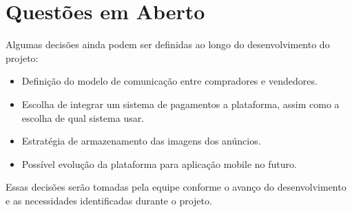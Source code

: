 \documentclass[a4paper,12pt]{article}
\begin{document}
\section{Questões em Aberto}

Algumas decisões ainda podem ser definidas ao longo do desenvolvimento do projeto:

\begin{itemize}
    \item Definição do modelo de comunicação entre compradores e vendedores.
    \item Escolha de integrar um sistema de pagamentos a plataforma, assim como a escolha de qual sistema usar.
    \item Estratégia de armazenamento das imagens dos anúncios.
    \item Possível evolução da plataforma para aplicação mobile no futuro.
\end{itemize}

Essas decisões serão tomadas pela equipe conforme o avanço do desenvolvimento e as necessidades identificadas durante o projeto.
\end{document}
